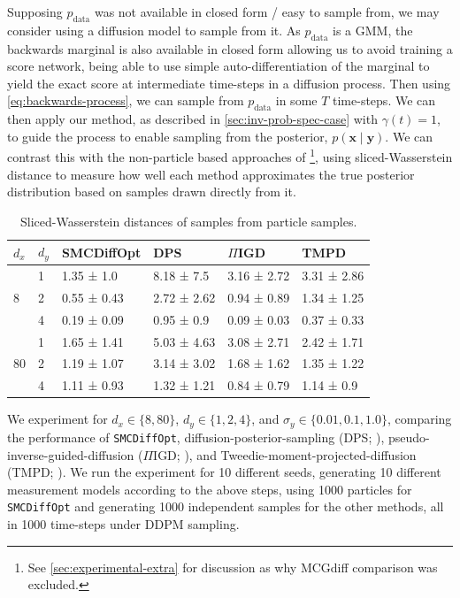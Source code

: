 Supposing $p_{\text{data}}$ was not available in closed form / easy to sample from, we may consider
using a diffusion model to sample from it. As $p_{\text{data}}$ is a GMM, the backwards marginal is
also available in closed form allowing us to avoid training a score network, being able to use
simple auto-differentiation of the marginal to yield the exact score at intermediate time-steps in a
diffusion process. Then using \autoref{eq:backwards-process}, we can sample from $p_{\text{data}}$
in some $T$ time-steps. We can then apply our method, as described in \autoref{sec:inv-prob-spec-case}
with $\gamma(t) = 1$, to guide the process to enable sampling from the posterior,
$p(\mathbf{x} \mid \mathbf{y})$. We can contrast this with the non-particle based approaches of
\textcite{song2023pseudoinverseguided,boysTweedieMomentProjected2023,chungDiffusionPosteriorSampling2022}
\footnote{See \autoref{sec:experimental-extra} for discussion as why MCGdiff comparison was excluded.},
using sliced-Wasserstein distance \parencite{boysTweedieMomentProjected2023,cardosoMonteCarloGuided2023}
to measure how well each method approximates the true posterior distribution based on samples
drawn directly from it.

\begin{table}[t]
    \centering
    \begin{tabular}{llllll}
        \toprule
        $d_x$ & $d_y$ & SMCDiffOpt & DPS & $\Pi$IGD & TMPD \\
        \midrule
        \multirow[t]{3}{*}{8} & 1 & 1.35 ± 1.0 & 8.18 ± 7.5 & 3.16 ± 2.72 & 3.31 ± 2.86 \\
         & 2 & 0.55 ± 0.43 & 2.72 ± 2.62 & 0.94 ± 0.89 & 1.34 ± 1.25 \\
         & 4 & 0.19 ± 0.09 & 0.95 ± 0.9 & 0.09 ± 0.03 & 0.37 ± 0.33 \\
        \cline{1-6}
        \multirow[t]{3}{*}{80} & 1 & 1.65 ± 1.41 & 5.03 ± 4.63 & 3.08 ± 2.71 & 2.42 ± 1.71 \\
         & 2 & 1.19 ± 1.07 & 3.14 ± 3.02 & 1.68 ± 1.62 & 1.35 ± 1.22 \\
         & 4 & 1.11 ± 0.93 & 1.32 ± 1.21 & 0.84 ± 0.79 & 1.14 ± 0.9 \\
        \cline{1-6}
        \bottomrule
    \end{tabular}
    \caption{Sliced-Wasserstein distances of samples from particle samples.}
    \label{tab:gmm}
\end{table}

We experiment for $d_x \in \{8, 80\}$, $d_y \in \{1, 2, 4\}$, and $\sigma_y \in \{0.01, 0.1, 1.0\}$,
comparing the performance of \texttt{SMCDiffOpt}, diffusion-posterior-sampling (DPS;
\cite{chungDiffusionPosteriorSampling2022}), pseudo-inverse-guided-diffusion ($\Pi$IGD;
\cite{song2023pseudoinverseguided}), and Tweedie-moment-projected-diffusion (TMPD;
\cite{boysTweedieMomentProjected2023}). We run the experiment for 10 different seeds,
generating 10 different measurement models according to the above steps, using 1000
particles for \texttt{SMCDiffOpt} and generating 1000 independent samples for the other methods,
all in 1000 time-steps under DDPM sampling.

